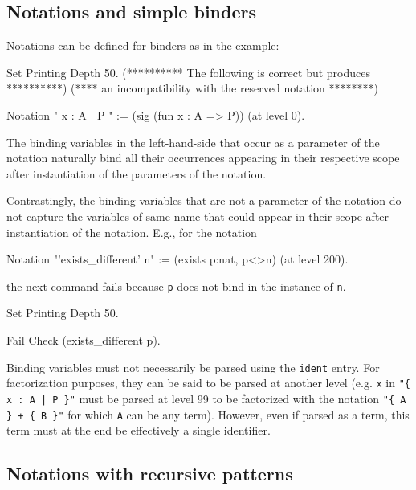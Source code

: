 \subsection{Notations and simple binders}

Notations can be defined for binders as in the example:

\begin{coq_eval}
Set Printing Depth 50.
(********** The following is correct but produces **********)
(**** an incompatibility with the reserved notation ********)
\end{coq_eval}
\begin{coq_example*}
Notation "{ x : A  |  P  }" := (sig (fun x : A => P)) (at level 0).
\end{coq_example*}

The binding variables in the left-hand-side that occur as a parameter
of the notation naturally bind all their occurrences appearing in
their respective scope after instantiation of the parameters of the
notation.

Contrastingly, the binding variables that are not a parameter of the
notation do not capture the variables of same name that
could appear in their scope after instantiation of the
notation. E.g., for the notation

\begin{coq_example*}
Notation "'exists_different' n" := (exists p:nat, p<>n) (at level 200).
\end{coq_example*}
the next command fails because {\tt p} does not bind in 
the instance of {\tt n}.
\begin{coq_eval}
Set Printing Depth 50.
\end{coq_eval}
\begin{coq_example}
Fail Check (exists_different p).
\end{coq_example}

\Rem Binding variables must not necessarily be parsed using the
{\tt ident} entry. For factorization purposes, they can be said to be
parsed at another level (e.g. {\tt x} in \verb="{ x : A | P }"= must be
parsed at level 99 to be factorized with the notation
\verb="{ A } + { B }"= for which {\tt A} can be any term).  
However, even if parsed as a term, this term must at the end be effectively 
a single identifier.

\subsection{Notations with recursive patterns}
\label{RecursiveNotations}

